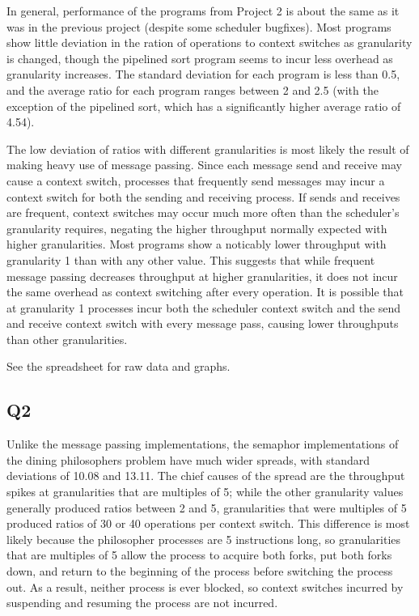 \documentclass[12pt]{article}
\begin{document}
In general, performance of the programs from Project 2 is about the same as it was in
the previous project (despite some scheduler bugfixes). Most programs show little 
deviation in the ration of operations to context switches as granularity is changed, though
the pipelined sort program seems to incur less overhead as granularity increases. The standard
deviation for each program is less than 0.5, and the average ratio for each program ranges
between 2 and 2.5 (with the exception of the pipelined sort, which has a significantly higher
average ratio of 4.54).

The low deviation of ratios with different granularities is most likely the result of making
heavy use of message passing. Since each message send and receive may cause a context
switch, processes that frequently send messages may incur a context switch for both
the sending and receiving process. If sends and receives are frequent, context switches
may occur much more often than the scheduler's granularity requires, negating the
higher throughput normally expected with higher granularities. Most programs show
a noticably lower throughput with granularity 1 than with any other value. This suggests
that while frequent message passing decreases throughput at higher granularities, it does
not incur the same overhead as context switching after every operation. It is possible that
at granularity 1 processes incur both the scheduler context switch and the send and receive
context switch with every message pass, causing lower throughputs than other granularities.

See the spreadsheet for raw data and graphs.
\subsection{Q2}
Unlike the message passing implementations, the semaphor implementations of the
dining philosophers problem have much wider spreads, with standard deviations of 10.08
and 13.11. The chief causes of the spread are the throughput spikes at granularities that
are multiples of 5; while the other granularity values generally produced ratios between
2 and 5, granularities that were multiples of 5 produced ratios of 30 or 40 operations per
context switch. 
This difference is most likely because the philosopher processes are
5 instructions long, so granularities that are multiples of 5 allow the process to acquire
both forks, put both forks down, and return to the beginning of the process before
switching the process out. As a result, neither process is ever blocked, so context switches
incurred by suspending and resuming the process are not incurred. 
\end{document}

